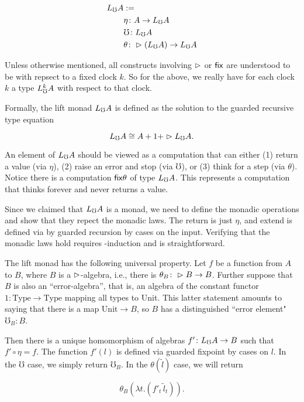 \begin{align*}
  L_\mho A &:= \\
  &\eta \colon A \to L_\mho A \\
  &\mho \colon L_\mho A \\
  &\theta \colon \vartriangleright (L_\mho A) \to L_\mho A
\end{align*}

Unless otherwise mentioned, all constructs involving $\vartriangleright$ or $\mathsf{fix}$
are understood to be with repsect to a fixed clock $k$. So for the above, we really have for each
clock $k$ a type $L_\mho^k A$ with respect to that clock.

Formally, the lift monad $L_\mho A$ is defined as the solution to the guarded recursive type equation

\[ L_\mho A \cong A + 1 + \vartriangleright L_\mho A. \]

An element of $L_\mho A$ should be viewed as a computation that can either (1) return a value (via $\eta$),
(2) raise an error and stop (via $\mho$), or (3) think for a step (via $\theta$).
%
Notice there is a computation $\mathsf{fix} \theta$ of type $L_\mho A$. This represents a computation
that thinks forever and never returns a value.

Since we claimed that $L_\mho A$ is a monad, we need to define the monadic operations
and show that they repect the monadic laws. The return is just $\eta$, and extend
is defined via by guarded recursion by cases on the input.
%
%
Verifying that the monadic laws hold requires \lob-induction and is straightforward.

The lift monad has the following universal property. Let $f$ be a function from $A$ to $B$,
where $B$ is a $\vartriangleright$-algebra, i.e., there is $\theta_B \colon \vartriangleright B \to B$.
Further suppose that $B$ is also an ``error-algebra'', that is, an algebra of the
constant functor $1 \colon \text{Type} \to \text{Type}$ mapping all types to Unit.
This latter statement amounts to saying that there is a map $\text{Unit} \to B$, so $B$ has a
distinguished ``error element" $\mho_B \colon B$.

Then there is a unique homomorphism of algebras $f' \colon L_\mho A \to B$ such that
$f' \circ \eta = f$. The function $f'(l)$ is defined via guarded fixpoint by cases on $l$. 
In the $\mho$ case, we simply return $\mho_B$.
In the $\theta(\tilde{l})$ case, we will return

\[\theta_B (\lambda t . (f'_t \, \tilde{l}_t)). \]

